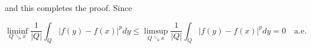 \documentclass[UTF8,a4paper,10pt]{article}
\begin{document}
and this completes the proof. Since 

\[\liminf_{Q \searrow x} \frac{1}{|Q|} \int_Q |f(y) - f(x)|^p dy 
\leq \limsup_{Q \searrow x} \frac{1}{|Q|} \int_Q |f(y) - f(x)|^p dy = 0 \quad \text{a.e.}
\]











\end{document}
